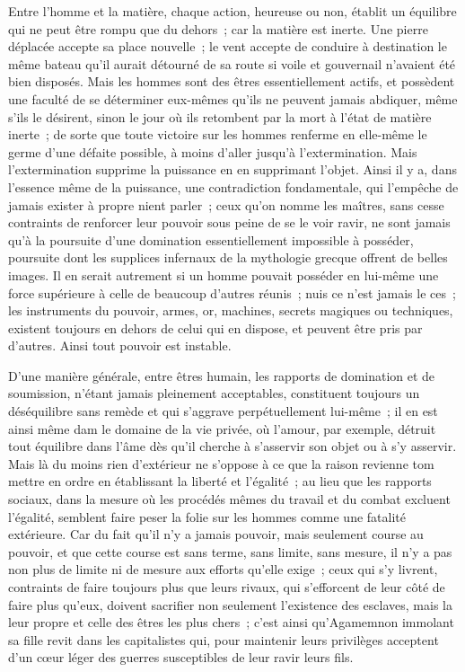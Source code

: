 \documentclass[french,twoside]{book} %
\begin{document}
Entre l'homme et la matière, chaque action, heureuse ou non, établit un équilibre qui ne peut être rompu que du dehors ; car la matière est inerte. Une pierre déplacée accepte sa place nouvelle ; le vent accepte de conduire à destination le même bateau qu'il aurait détourné de sa route si voile et gouvernail n'avaient été bien disposés. Mais les hommes sont des êtres essentiellement actifs, et possèdent une faculté de se déterminer eux-mêmes qu'ils ne peuvent jamais abdiquer, même s'ils le désirent, sinon le jour où ils retombent par la mort à l'état de matière inerte ; de sorte que toute victoire sur les hommes renferme en elle-même le germe d'une défaite possible, à moins d'aller jusqu'à l'extermination. Mais l'extermination supprime la puissance en en supprimant l'objet. Ainsi il y a, dans l'essence même de la puissance, une contradiction fondamentale, qui l'empêche de jamais exister à propre nient parler ; ceux qu'on nomme les maîtres, sans cesse contraints de renforcer leur pouvoir sous peine de se le voir ravir, ne sont jamais qu'à la poursuite d'une domination essentiellement impossible à posséder, poursuite dont les supplices infernaux de la mythologie grecque offrent de belles images. Il en serait autrement si un homme pouvait posséder en lui-même une force supérieure à celle de beaucoup d'autres réunis ; nuis ce n'est jamais le ces ; les instruments du pouvoir, armes, or, machines, secrets magiques ou techniques, existent toujours en dehors de celui qui en dispose, et peuvent être pris par d'autres. Ainsi tout pouvoir est instable.\par
D'une manière générale, entre êtres humain, les rapports de domination et de soumission, n'étant jamais pleinement acceptables, constituent toujours un déséquilibre sans remède et qui s'aggrave perpétuellement lui-même ; il en est ainsi même dam le domaine de la vie privée, où l'amour, par exemple, détruit tout équilibre dans l'âme dès qu'il cherche à s'asservir son objet ou à s'y asservir. Mais là du moins rien d'extérieur ne s'oppose à ce que la raison revienne tom mettre en ordre en établissant la liberté et l'égalité ; au lieu que les rapports sociaux, dans la mesure où les procédés mêmes du travail et du combat excluent l'égalité, semblent faire peser la folie sur les hommes comme une fatalité extérieure. Car du fait qu'il n'y a jamais pouvoir, mais seulement course au pouvoir, et que cette course est sans terme, sans limite, sans mesure, il n'y a pas non plus de limite ni de mesure aux efforts qu'elle exige ; ceux qui s'y livrent, contraints de faire toujours plus que leurs rivaux, qui s'efforcent de leur côté de faire plus qu'eux, doivent sacrifier non seulement l'existence des esclaves, mais la leur propre et celle des êtres les plus chers ; c'est ainsi qu'Agamemnon immolant sa fille revit dans les capitalistes qui, pour maintenir leurs privilèges acceptent d'un cœur léger des guerres susceptibles de leur ravir leurs fils.\par
\end{document}
